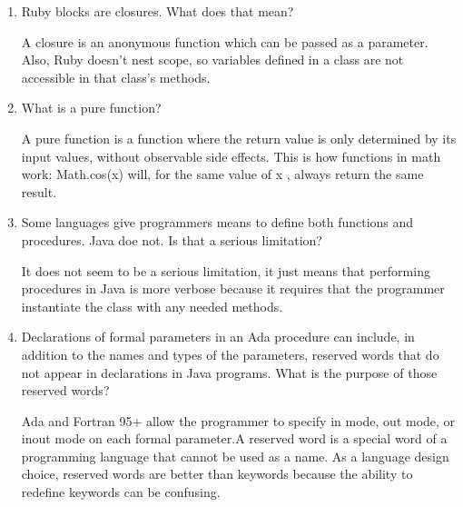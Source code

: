 \begin{enumerate}
  \item Ruby blocks are closures. What does that mean?
  
  \begin{answer}
  
  A closure is an anonymous function which can be passed as a parameter. Also, Ruby doesn't nest scope, so variables defined in a class are not accessible in that class's methods.
  
  \end{answer}

  \item What is a pure function?
  
  \begin{answer}
  
  A pure function is a function where the return value is only determined by its input values, without observable side effects. This is how functions in math work: Math.cos(x) will, for the same value of x , always return the same result.
  
  \end{answer}

  \item Some languages give programmers means to define
    both functions and procedures. Java doe not. Is that
    a serious limitation?
    
    \begin{answer}
    
    It does not seem to be a serious limitation, it just means that performing procedures in Java is more verbose because it requires that the programmer instantiate the class with any needed methods.
    
    \end{answer}

  \item Declarations of formal parameters in an Ada procedure
    can include, in addition to the names and types of the
    parameters, reserved words that do not appear in declarations
    in Java programs. 
    What is the purpose of those reserved words?
    
    \begin{answer}
    
    Ada and Fortran 95+ allow the programmer to specify in mode, out mode, or inout mode on each formal parameter.A reserved word is a special word of a programming language that cannot be used as a name. As a language design choice, reserved words are better than keywords because the ability to redefine keywords can be confusing.


\end{answer}
\end{enumerate}
